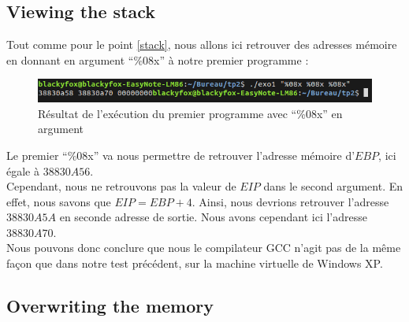 \subsection{Viewing the stack}

Tout comme pour le point \ref{stack}, nous allons ici retrouver des adresses mémoire en donnant en argument \enquote{\%08x} à notre premier programme :
\begin{figure}[H]
  \centering
  \includegraphics[width=.9\textwidth]{img/c3.png}
  \caption{Résultat de l'exécution du premier programme avec \enquote{\%08x} en argument} 
  \label{img:li:3}
\end{figure}
Le premier \enquote{\%08x} va nous permettre de retrouver l'adresse mémoire d'$EBP$, ici égale à $38830A56$.\\
Cependant, nous ne retrouvons pas la valeur de $EIP$ dans le second argument. En effet, nous savons que $EIP=EBP+4$. Ainsi, nous devrions retrouver l'adresse $38830A5A$ en seconde adresse de sortie. Nous avons cependant ici l'adresse $38830A70$.\\
Nous pouvons donc conclure que nous le compilateur GCC n'agit pas de la même façon que dans notre test précédent, sur la machine virtuelle de Windows XP.

\subsection{Overwriting the memory}

